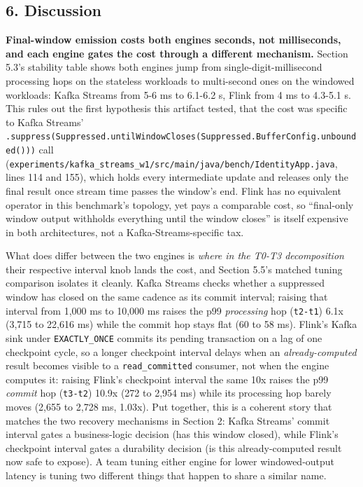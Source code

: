 \documentclass[
]{article}
\begin{document}
\hypertarget{discussion}{%
\subsection{6. Discussion}\label{discussion}}

\textbf{Final-window emission costs both engines seconds, not
milliseconds, and each engine gates the cost through a different
mechanism.} Section 5.3's stability table shows both engines jump from
single-digit-millisecond processing hops on the stateless workloads to
multi-second ones on the windowed workloads: Kafka Streams from 5-6 ms
to 6.1-6.2 s, Flink from 4 ms to 4.3-5.1 s. This rules out the first
hypothesis this artifact tested, that the cost was specific to Kafka
Streams'
\texttt{.suppress(Suppressed.untilWindowCloses(Suppressed.BufferConfig.unbounded()))}
call
(\texttt{experiments/kafka\_streams\_w1/src/main/java/bench/IdentityApp.java},
lines 114 and 155), which holds every intermediate update and releases
only the final result once stream time passes the window's end. Flink
has no equivalent operator in this benchmark's topology, yet pays a
comparable cost, so ``final-only window output withholds everything
until the window closes'' is itself expensive in both architectures, not
a Kafka-Streams-specific tax.

What does differ between the two engines is \emph{where in the T0-T3
decomposition} their respective interval knob lands the cost, and
Section 5.5's matched tuning comparison isolates it cleanly. Kafka
Streams checks whether a suppressed window has closed on the same
cadence as its commit interval; raising that interval from 1,000 ms to
10,000 ms raises the p99 \emph{processing} hop (\texttt{t2-t1}) 6.1x
(3,715 to 22,616 ms) while the commit hop stays flat (60 to 58 ms).
Flink's Kafka sink under \texttt{EXACTLY\_ONCE} commits its pending
transaction on a lag of one checkpoint cycle, so a longer checkpoint
interval delays when an \emph{already-computed} result becomes visible
to a \texttt{read\_committed} consumer, not when the engine computes it:
raising Flink's checkpoint interval the same 10x raises the p99
\emph{commit} hop (\texttt{t3-t2}) 10.9x (272 to 2,954 ms) while its
processing hop barely moves (2,655 to 2,728 ms, 1.03x). Put together,
this is a coherent story that matches the two recovery mechanisms in
Section 2: Kafka Streams' commit interval gates a business-logic
decision (has this window closed), while Flink's checkpoint interval
gates a durability decision (is this already-computed result now safe to
expose). A team tuning either engine for lower windowed-output latency
is tuning two different things that happen to share a similar name.
\end{document}
